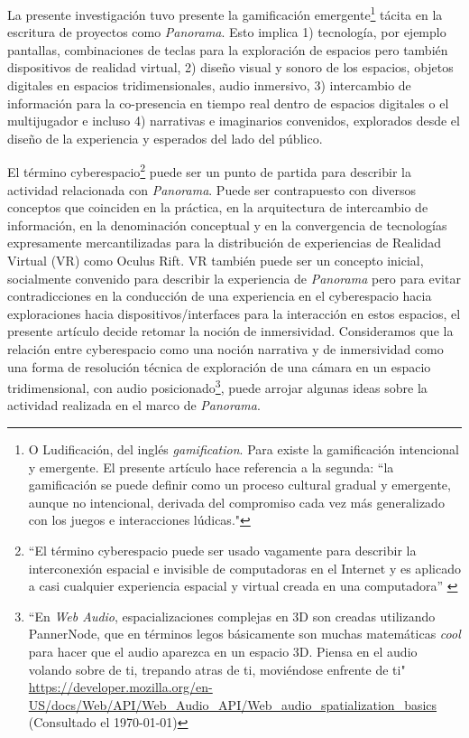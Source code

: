 La presente investigación tuvo presente la gamificación emergente\footnote{O Ludificación, del inglés \textit{gamification}. Para \cite{gamificacion} existe la gamificación intencional y emergente. El presente artículo hace referencia a la segunda: ``la gamificación se puede definir como un proceso cultural gradual y emergente, aunque no intencional, derivada del compromiso cada vez más generalizado con los juegos e interacciones lúdicas."} tácita en la escritura de proyectos como \textit{Panorama}. Esto implica 1) tecnología, por ejemplo pantallas, combinaciones de teclas para la exploración de espacios pero también dispositivos de realidad virtual, 2) diseño visual y sonoro de los espacios, objetos digitales en espacios tridimensionales, audio inmersivo, 3) intercambio de información para la co-presencia en tiempo real dentro de espacios digitales o el multijugador e incluso 4) narrativas e imaginarios convenidos, explorados desde el diseño de la experiencia y esperados del lado del público. 



El término cyberespacio\footnote{``El término cyberespacio puede ser usado vagamente para describir la interconexión espacial e invisible de computadoras en el Internet y es aplicado a casi cualquier experiencia espacial y virtual creada en una computadora'' \citep{cyberspace}} puede ser un punto de partida para describir la actividad relacionada con \textit{Panorama}. Puede ser contrapuesto con diversos conceptos que coinciden en la práctica, en la arquitectura de intercambio de información, en la denominación conceptual y en la convergencia de tecnologías expresamente mercantilizadas para la distribución de experiencias de Realidad Virtual (VR) como Oculus Rift. VR también puede ser un concepto inicial, socialmente convenido para describir la experiencia de \textit{Panorama} pero para evitar contradicciones en la conducción de una experiencia en el cyberespacio hacia exploraciones hacia dispositivos/interfaces para la interacción en estos espacios, el presente artículo decide retomar la noción de inmersividad. Consideramos que la relación entre cyberespacio como una noción narrativa y de inmersividad como una forma de resolución técnica de exploración de una cámara en un espacio tridimensional, con audio posicionado\footnote{``En \textit{Web Audio}, espacializaciones complejas en 3D son creadas utilizando PannerNode, que en términos legos básicamente son muchas matemáticas \textit{cool} para hacer que el audio aparezca en un espacio 3D. Piensa en el audio volando sobre de ti, trepando atras de ti, moviéndose enfrente de ti" \url{https://developer.mozilla.org/en-US/docs/Web/API/Web_Audio_API/Web_audio_spatialization_basics} (Consultado el \today)}, puede arrojar algunas ideas sobre la actividad realizada en el marco de \textit{Panorama}. %

